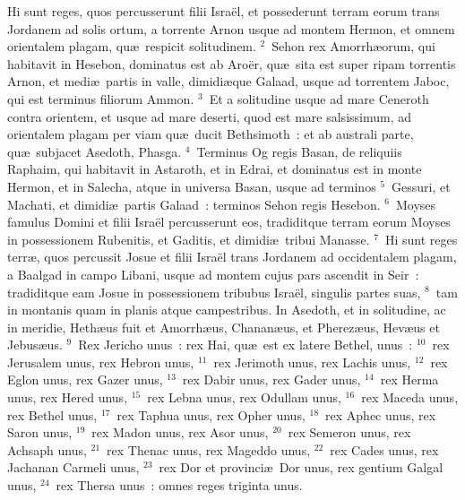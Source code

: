 \lettrine[lines=3,image=true,loversize=0.05,lraise=-0.03]{H}{}i sunt reges, quos percusserunt filii Isra\"el, et possederunt terram eorum trans Jordanem ad solis ortum, a torrente Arnon usque ad montem Hermon, et omnem orientalem plagam, qu\ae\ respicit solitudinem.
${}^{2}$~Sehon rex Amorrh\ae orum, qui habitavit in Hesebon, dominatus est ab Aro\"er, qu\ae\ sita est super ripam torrentis Arnon, et medi\ae\ partis in valle, dimidi\ae que Galaad, usque ad torrentem Jaboc, qui est terminus filiorum Ammon.
${}^{3}$~Et a solitudine usque ad mare Ceneroth contra orientem, et usque ad mare deserti, quod est mare salsissimum, ad orientalem plagam per viam qu\ae\ ducit Bethsimoth~: et ab australi parte, qu\ae\ subjacet Asedoth, Phasga.
${}^{4}$~Terminus Og regis Basan, de reliquiis Raphaim, qui habitavit in Astaroth, et in Edrai, et dominatus est in monte Hermon, et in Salecha, atque in universa Basan, usque ad terminos
${}^{5}$~Gessuri, et Machati, et dimidi\ae\ partis Galaad~: terminos Sehon regis Hesebon.
${}^{6}$~Moyses famulus Domini et filii Isra\"el percusserunt eos, tradiditque terram eorum Moyses in possessionem Rubenitis, et Gaditis, et dimidi\ae\ tribui Manasse.
${}^{7}$~Hi sunt reges terr\ae , quos percussit Josue et filii Isra\"el trans Jordanem ad occidentalem plagam, a Baalgad in campo Libani, usque ad montem cujus pars ascendit in Seir~: tradiditque eam Josue in possessionem tribubus Isra\"el, singulis partes suas,
${}^{8}$~tam in montanis quam in planis atque campestribus. In Asedoth, et in solitudine, ac in meridie, Heth\ae us fuit et Amorrh\ae us, Chanan\ae us, et Pherez\ae us, Hev\ae us et Jebus\ae us.
${}^{9}$~Rex Jericho unus~: rex Hai, qu\ae\ est ex latere Bethel, unus~:
${}^{10}$~rex Jerusalem unus, rex Hebron unus,
${}^{11}$~rex Jerimoth unus, rex Lachis unus,
${}^{12}$~rex Eglon unus, rex Gazer unus,
${}^{13}$~rex Dabir unus, rex Gader unus,
${}^{14}$~rex Herma unus, rex Hered unus,
${}^{15}$~rex Lebna unus, rex Odullam unus,
${}^{16}$~rex Maceda unus, rex Bethel unus,
${}^{17}$~rex Taphua unus, rex Opher unus,
${}^{18}$~rex Aphec unus, rex Saron unus,
${}^{19}$~rex Madon unus, rex Asor unus,
${}^{20}$~rex Semeron unus, rex Achsaph unus,
${}^{21}$~rex Thenac unus, rex Mageddo unus,
${}^{22}$~rex Cades unus, rex Jachanan Carmeli unus,
${}^{23}$~rex Dor et provinci\ae\ Dor unus, rex gentium Galgal unus,
${}^{24}$~rex Thersa unus~: omnes reges triginta unus.

